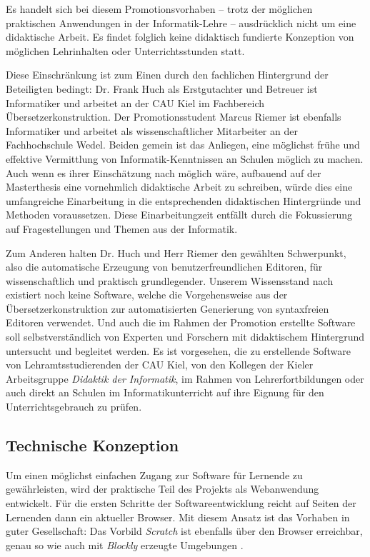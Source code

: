 \documentclass[paper=a4,fontsize=11pt,parskip=half]{scrartcl}
\begin{document}
Es handelt sich bei diesem Promotionsvorhaben -- trotz der möglichen praktischen Anwendungen in der Informatik-Lehre -- ausdrücklich nicht um eine didaktische Arbeit. Es findet folglich keine didaktisch fundierte Konzeption von möglichen Lehrinhalten oder Unterrichtsstunden statt.

Diese Einschränkung ist zum Einen durch den fachlichen Hintergrund der Beteiligten bedingt: Dr. Frank Huch als Erstgutachter und Betreuer ist Informatiker und arbeitet an der CAU Kiel im Fachbereich Übersetzerkonstruktion. Der Promotionsstudent Marcus Riemer ist ebenfalls Informatiker und arbeitet als wissenschaftlicher Mitarbeiter an der Fachhochschule Wedel. Beiden gemein ist das Anliegen, eine möglichst frühe und effektive Vermittlung von Informatik-Kenntnissen an Schulen möglich zu machen. Auch wenn es ihrer Einschätzung nach möglich wäre, aufbauend auf der Masterthesis eine vornehmlich didaktische Arbeit zu schreiben, würde dies eine umfangreiche Einarbeitung in die entsprechenden didaktischen Hintergründe und Methoden voraussetzen. Diese Einarbeitungzeit entfällt durch die Fokussierung auf Fragestellungen und Themen aus der Informatik.

Zum Anderen halten Dr. Huch und Herr Riemer den gewählten Schwerpunkt, also die automatische Erzeugung von benutzerfreundlichen Editoren, für wissenschaftlich und praktisch grundlegender. Unserem Wissensstand nach existiert noch keine Software, welche die Vorgehensweise aus der Übersetzerkonstruktion zur automatisierten Generierung von syntaxfreien Editoren verwendet. Und auch die im Rahmen der Promotion erstellte Software soll selbstverständlich von Experten und Forschern mit didaktischem Hintergrund untersucht und begleitet werden. Es ist vorgesehen, die zu erstellende Software von Lehramtsstudierenden der CAU Kiel, von den Kollegen der Kieler Arbeitsgruppe \textit{Didaktik der Informatik}, im Rahmen von Lehrerfortbildungen oder auch direkt an Schulen im Informatikunterricht auf ihre Eignung für den Unterrichtsgebrauch zu prüfen.

\subsection{Technische Konzeption}

Um einen möglichst einfachen Zugang zur Software für Lernende zu gewährleisten, wird der praktische Teil des Projekts als Webanwendung entwickelt. Für die ersten Schritte der Softwareentwicklung reicht auf Seiten der Lernenden dann ein aktueller Browser. Mit diesem Ansatz ist das Vorhaben in guter Gesellschaft: Das Vorbild \textit{Scratch} ist ebenfalls über den Browser erreichbar, genau so wie auch mit \textit{Blockly} erzeugte Umgebungen \cite[vgl. S. 28]{riemer_blattwerkzeug_2016}.
\end{document}
